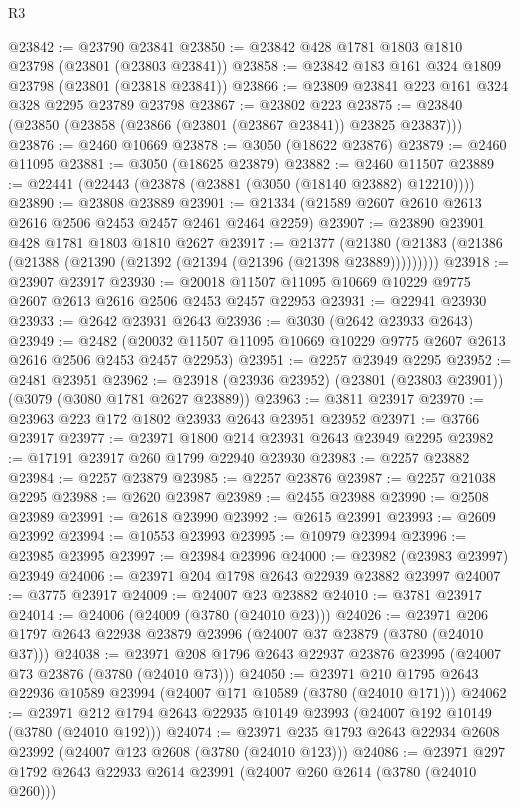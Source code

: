 \begin{lexlean}{R3}
\begin{coremodule}
@23842 := @23790 @23841
@23850 := @23842 @428 @1781 @1803 @1810 @23798 (@23801 (@23803 @23841))
@23858 := @23842 @183 @161 @324 @1809 @23798 (@23801 (@23818 @23841))
@23866 := @23809 @23841 @223 @161 @324 @328 @2295 @23789 @23798
@23867 := @23802 @223
@23875 := @23840 (@23850 (@23858 (@23866 (@23801 (@23867 @23841)) @23825 @23837)))
@23876 := @2460 @10669
@23878 := @3050 (@18622 @23876)
@23879 := @2460 @11095
@23881 := @3050 (@18625 @23879)
@23882 := @2460 @11507
@23889 := @22441 (@22443 (@23878 (@23881 (@3050 (@18140 @23882) @12210))))
@23890 := @23808 @23889
@23901 := @21334 (@21589 @2607 @2610 @2613 @2616 @2506 @2453 @2457 @2461 @2464 @2259)
@23907 := @23890 @23901 @428 @1781 @1803 @1810 @2627
@23917 := @21377
    (@21380 (@21383 (@21386 (@21388 (@21390 (@21392 (@21394 (@21396 (@21398 @23889)))))))))
@23918 := @23907 @23917
@23930 := @20018 @11507 @11095 @10669 @10229 @9775 @2607 @2613 @2616 @2506 @2453 @2457 @22953
@23931 := @22941 @23930
@23933 := @2642 @23931 @2643
@23936 := @3030 (@2642 @23933 @2643)
@23949 := @2482
    (@20032 @11507 @11095 @10669 @10229 @9775 @2607 @2613 @2616 @2506 @2453 @2457 @22953)
@23951 := @2257 @23949 @2295
@23952 := @2481 @23951
@23962 := @23918 (@23936 @23952) (@23801 (@23803 @23901)) (@3079 (@3080 @1781 @2627 @23889))
@23963 := @3811 @23917
@23970 := @23963 @223 @172 @1802 @23933 @2643 @23951 @23952
@23971 := @3766 @23917
@23977 := @23971 @1800 @214 @23931 @2643 @23949 @2295
@23982 := @17191 @23917 @260 @1799 @22940 @23930
@23983 := @2257 @23882
@23984 := @2257 @23879
@23985 := @2257 @23876
@23987 := @2257 @21038 @2295
@23988 := @2620 @23987
@23989 := @2455 @23988
@23990 := @2508 @23989
@23991 := @2618 @23990
@23992 := @2615 @23991
@23993 := @2609 @23992
@23994 := @10553 @23993
@23995 := @10979 @23994
@23996 := @23985 @23995
@23997 := @23984 @23996
@24000 := @23982 (@23983 @23997) @23949
@24006 := @23971 @204 @1798 @2643 @22939 @23882 @23997
@24007 := @3775 @23917
@24009 := @24007 @23 @23882
@24010 := @3781 @23917
@24014 := @24006 (@24009 (@3780 (@24010 @23)))
@24026 := @23971 @206 @1797 @2643 @22938 @23879 @23996 (@24007 @37 @23879 (@3780 (@24010 @37)))
@24038 := @23971 @208 @1796 @2643 @22937 @23876 @23995 (@24007 @73 @23876 (@3780 (@24010 @73)))
@24050 := @23971 @210 @1795 @2643 @22936 @10589 @23994 (@24007 @171 @10589 (@3780 (@24010 @171)))
@24062 := @23971 @212 @1794 @2643 @22935 @10149 @23993 (@24007 @192 @10149 (@3780 (@24010 @192)))
@24074 := @23971 @235 @1793 @2643 @22934 @2608 @23992 (@24007 @123 @2608 (@3780 (@24010 @123)))
@24086 := @23971 @297 @1792 @2643 @22933 @2614 @23991 (@24007 @260 @2614 (@3780 (@24010 @260)))

\end{coremodule}
\end{lexlean}
